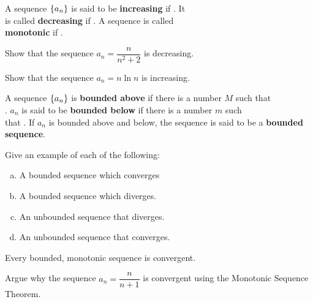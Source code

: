 \documentclass[notes]{subfiles}
\begin{document}
		\begin{defn}
			A sequence $\left\lbrace a_n \right\rbrace$ is said to be \textbf{increasing} if .  It\\[15pt] is called \textbf{decreasing} if .  A sequence is called\\[15pt] \textbf{monotonic} if .
		\end{defn}
			
		\begin{ex}
			Show that the sequence $a_n = \dfrac{n}{n^2 + 2}$ is decreasing.
		\end{ex}
			
		\begin{ex}
			Show that the sequence $a_n = n\ln n$ is increasing.
		\end{ex}
		
		\begin{defn}
			A sequence $\left\lbrace a_n \right\rbrace$ is \textbf{bounded above} if there is a number $M$ such that \\[15pt] .  $a_n$ is said to be \textbf{bounded below} if there is a number $m$ such\\[15pt] that .  If $a_n$ is bounded above and below, the sequence is said to be a \textbf{bounded sequence}.
		\end{defn}
			\newpage
		
		\begin{ex}
			Give an example of each of the following:
			\begin{enumerate}[(a)]
				\item A bounded sequence which converges
					
				\item A bounded sequence which diverges.
					
				\item An unbounded sequence that diverges.
					
				\item An unbounded sequence that converges.
			\end{enumerate}
		\end{ex}
		
		\begin{thm}
			Every bounded, monotonic sequence is convergent.
		\end{thm}
		
		\begin{ex}
			Argue why the sequence $a_n = \dfrac{n}{n+1}$ is convergent using the Monotonic Sequence Theorem.
		\end{ex}
			\newpage
			
\end{document}

